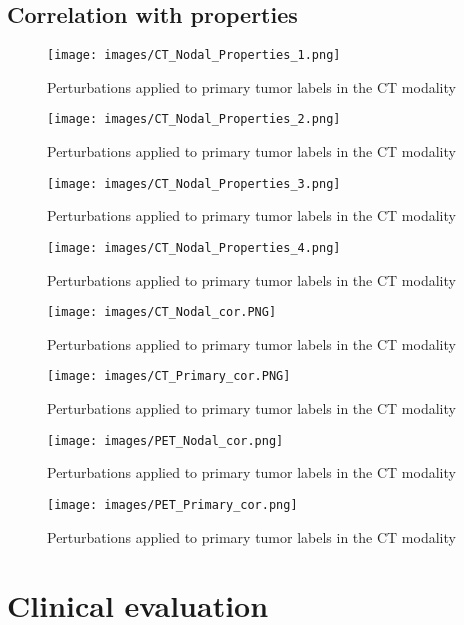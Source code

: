\subsection{Correlation with properties}
\begin{figure}[ht]
    \centering
    \texttt{[image: images/CT\_Nodal\_Properties\_1.png]}
    \caption{Perturbations applied to primary tumor labels in the CT modality}
    \label{fig:three_subfigures}
\end{figure}
\begin{figure}[ht]
    \centering
    \texttt{[image: images/CT\_Nodal\_Properties\_2.png]}
    \caption{Perturbations applied to primary tumor labels in the CT modality}
    \label{fig:three_subfigures}
\end{figure}
\begin{figure}[ht]
    \centering
    \texttt{[image: images/CT\_Nodal\_Properties\_3.png]}
    \caption{Perturbations applied to primary tumor labels in the CT modality}
    \label{fig:three_subfigures}
\end{figure}
\begin{figure}[ht]
    \centering
    \texttt{[image: images/CT\_Nodal\_Properties\_4.png]}
    \caption{Perturbations applied to primary tumor labels in the CT modality}
    \label{fig:three_subfigures}
\end{figure}
\begin{figure}[ht]
    \centering
    \texttt{[image: images/CT\_Nodal\_cor.PNG]}
    \caption{Perturbations applied to primary tumor labels in the CT modality}
    \label{fig:three_subfigures}
\end{figure}
\begin{figure}[ht]
    \centering
    \texttt{[image: images/CT\_Primary\_cor.PNG]}
    \caption{Perturbations applied to primary tumor labels in the CT modality}
    \label{fig:three_subfigures}
\end{figure}
\begin{figure}[ht]
    \centering
    \texttt{[image: images/PET\_Nodal\_cor.png]}
    \caption{Perturbations applied to primary tumor labels in the CT modality}
    \label{fig:three_subfigures}
\end{figure}
\begin{figure}[ht]
    \centering
    \texttt{[image: images/PET\_Primary\_cor.png]}
    \caption{Perturbations applied to primary tumor labels in the CT modality}
    \label{fig:three_subfigures}
\end{figure}
\section{Clinical evaluation}

